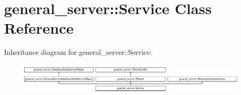 \hypertarget{classgeneral__server_1_1Service}{\section{general\-\_\-server\-:\-:\-Service \-Class \-Reference}
\label{classgeneral__server_1_1Service}
}
\-Inheritance diagram for general\-\_\-server\-:\-:\-Service\-:\begin{figure}[H]
\begin{center}
\leavevmode
\includegraphics[height=1.573034cm]{classgeneral__server_1_1Service}
\end{center}
\end{figure}
